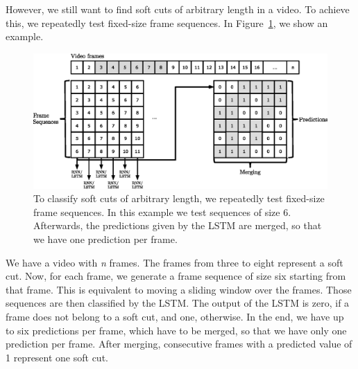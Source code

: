 However, we still want to find soft cuts of arbitrary length in a video.
To achieve this, we repeatedly test fixed-size frame sequences.
In Figure~\ref{fig:soft_cut_approach}, we show an example.
\begin{figure}[!htb]
	\centering
	\includegraphics[scale=.7]{images/soft_cut_approach.eps}
	\caption{To classify soft cuts of arbitrary length, we repeatedly test fixed-size frame sequences. In this example we test sequences of size 6. Afterwards, the predictions given by the LSTM are merged, so that we have one prediction per frame.}
	\label{fig:soft_cut_approach}
\end{figure}
We have a video with \textit{n} frames.
The frames from three to eight represent a soft cut.
Now, for each frame, we generate a frame sequence of size six starting from that frame.
This is equivalent to moving a sliding window over the frames.
Those sequences are then classified by the LSTM.
The output of the LSTM is zero, if a frame does not belong to a soft cut, and one, otherwise.
In the end, we have up to six predictions per frame, which have to be merged, so that we have only one prediction per frame.
After merging, consecutive frames with a predicted value of 1 represent one soft cut.


